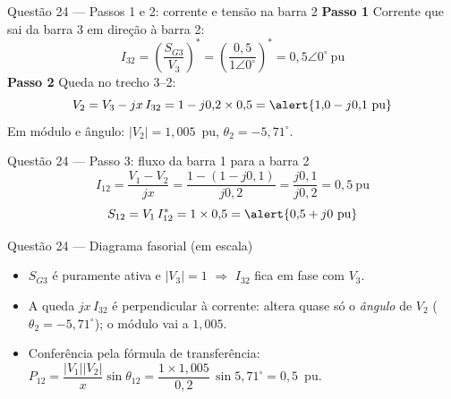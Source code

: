 \documentclass[aspectratio=169]{../../TemplateBeamerUFC/libs/ufc_format}
\newcommand{\passo}[1]{{\color{blue_theme}\bfseries #1}\enspace}
\begin{document}
\begin{frame}{Questão 24 --- Passos 1 e 2: corrente e tensão na barra 2}
  \passo{Passo 1} Corrente que sai da barra 3 em direção à barra 2:
  \[
    I_{32} = \left(\frac{S_{G3}}{V_3}\right)^{\!*}
           = \left(\frac{0{,}5}{1\angle 0^\circ}\right)^{\!*} = 0{,}5\angle 0^\circ~\text{pu}
  \]
  \pause
  \passo{Passo 2} Queda no trecho 3--2:
  \[
    V_2 = V_3 - jx\,I_{32} = 1 - j0{,}2 \times 0{,}5
        = \alert{1{,}0 - j0{,}1~\text{pu}}
  \]
  \pause
  {\small\color{black!55} Em módulo e ângulo: $|V_2| = 1{,}005$~pu,
  $\theta_2 = -5{,}71^\circ$.}
\end{frame}

\begin{frame}{Questão 24 --- Passo 3: fluxo da barra 1 para a barra 2}
  \[
    I_{12} = \frac{V_1 - V_2}{jx} = \frac{1 - (1 - j0{,}1)}{j0{,}2}
           = \frac{j0{,}1}{j0{,}2} = 0{,}5~\text{pu}
  \]
  \pause
  \[
    S_{12} = V_1\, I_{12}^{*} = 1 \times 0{,}5 = \alert{0{,}5 + j0~\text{pu}}
  \]
  \pause
\end{frame}

\begin{frame}{Questão 24 --- Diagrama fasorial (em escala)}
  \centering

  \vspace{0.8em}\raggedright\small
  \begin{itemize}
    \pause
    \item $S_{G3}$ é puramente ativa e $|V_3|=1$ $\Rightarrow$ $I_{32}$ fica
          \alert{em fase} com $V_3$.
    \pause
    \item A queda $jx\,I_{32}$ é perpendicular à corrente: altera quase só o
          \emph{ângulo} de $V_2$ ($\theta_2 = -5{,}71^\circ$); o módulo vai a $1{,}005$.
    \pause
    \item Conferência pela fórmula de transferência:
          $P_{12} = \dfrac{|V_1||V_2|}{x}\sin\theta_{12}
          = \dfrac{1 \times 1{,}005}{0{,}2}\,\sin 5{,}71^\circ = 0{,}5$~pu.
  \end{itemize}
\end{frame}
\end{document}
